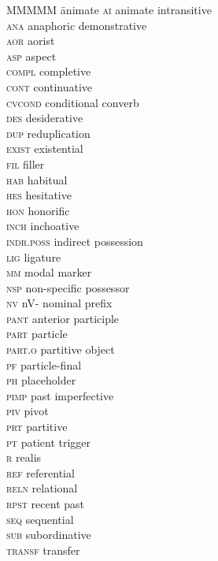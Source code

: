 \documentclass[output=paper]{langscibook}
\begin{document}
\begin{multicols}{2}
\begin{tabbing}
MMMMM \= animate\kill
\textsc{ai} \> animate intransitive\\
\textsc{ana} \> anaphoric demonstrative\\
\textsc{aor} \> aorist\\
\textsc{asp} \> aspect\\
\textsc{compl} \> completive\\
\textsc{cont} \> continuative\\
\textsc{cvcond} \> conditional converb\\
\textsc{des} \> desiderative\\
\textsc{dup} \> reduplication\\
\textsc{exist} \> existential\\
\textsc{fil} \> filler\\
\textsc{hab} \> habitual\\
\textsc{hes} \> hesitative\\
\textsc{hon} \> honorific\\
\textsc{inch} \> inchoative\\
\textsc{indr.poss} \> indirect possession\\
\textsc{lig} \> ligature\\
\textsc{mm} \> modal marker\\
\textsc{nsp} \> non-specific possessor\\
\textsc{nv} \> nV- nominal prefix\\
\textsc{pant} \> anterior participle\\
\textsc{part} \> particle\\
\textsc{part.o} \> partitive object\\
\textsc{pf} \> particle-final\\
\textsc{ph} \> placeholder\\
\textsc{pimp} \> past imperfective\\
\textsc{piv} \> pivot\\
\textsc{prt} \> partitive\\
\textsc{pt} \> patient trigger\\
\textsc{r} \> realis\\
\textsc{ref} \> referential\\
\textsc{reln} \> relational\\
\textsc{rpst} \> recent past\\
\textsc{seq} \> sequential\\
\textsc{sub} \> subordinative\\
\textsc{transf} \> transfer
\end{tabbing}
\end{multicols}

\printbibliography[heading=subbibliography,notkeyword=this]
\end{document}
